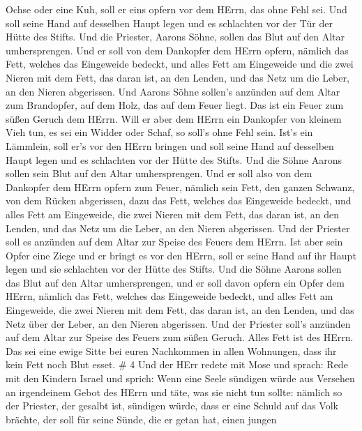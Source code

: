 Ochse oder eine Kuh, soll er eins opfern vor dem HErrn, das ohne Fehl
sei.  Und soll seine Hand auf desselben Haupt legen und es
schlachten vor der Tür der Hütte des Stifts. Und die Priester, Aarons
Söhne, sollen das Blut auf den Altar umhersprengen.  Und er
soll von dem Dankopfer dem HErrn opfern, nämlich das Fett, welches das
Eingeweide bedeckt, und alles Fett am Eingeweide  und die
zwei Nieren mit dem Fett, das daran ist, an den Lenden, und das Netz um
die Leber, an den Nieren abgerissen.  Und Aarons Söhne
sollen's anzünden auf dem Altar zum Brandopfer, auf dem Holz, das auf
dem Feuer liegt. Das ist ein Feuer zum süßen Geruch dem HErrn.
 Will er aber dem HErrn ein Dankopfer von kleinem Vieh tun,
es sei ein Widder oder Schaf, so soll's ohne Fehl sein. 
Ist's ein Lämmlein, soll er's vor den HErrn bringen  und
soll seine Hand auf desselben Haupt legen und es schlachten vor der
Hütte des Stifts. Und die Söhne Aarons sollen sein Blut auf den Altar
umhersprengen.  Und er soll also von dem Dankopfer dem HErrn
opfern zum Feuer, nämlich sein Fett, den ganzen Schwanz, von dem Rücken
abgerissen, dazu das Fett, welches das Eingeweide bedeckt, und alles
Fett am Eingeweide,  die zwei Nieren mit dem Fett, das
daran ist, an den Lenden, und das Netz um die Leber, an den Nieren
abgerissen.  Und der Priester soll es anzünden auf dem
Altar zur Speise des Feuers dem HErrn.  Ist aber sein Opfer
eine Ziege und er bringt es vor den HErrn,  soll er seine
Hand auf ihr Haupt legen und sie schlachten vor der Hütte des Stifts.
Und die Söhne Aarons sollen das Blut auf den Altar umhersprengen,
 und er soll davon opfern ein Opfer dem HErrn, nämlich das
Fett, welches das Eingeweide bedeckt, und alles Fett am Eingeweide,
 die zwei Nieren mit dem Fett, das daran ist, an den
Lenden, und das Netz über der Leber, an den Nieren abgerissen.
 Und der Priester soll's anzünden auf dem Altar zur Speise
des Feuers zum süßen Geruch. Alles Fett ist des HErrn.  Das
sei eine ewige Sitte bei euren Nachkommen in allen Wohnungen, dass ihr
kein Fett noch Blut esset. \# 4  Und der HErr redete mit
Mose und sprach:  Rede mit den Kindern Israel und sprich:
Wenn eine Seele sündigen würde aus Versehen an irgendeinem Gebot des
HErrn und täte, was sie nicht tun sollte:  nämlich so der
Priester, der gesalbt ist, sündigen würde, dass er eine Schuld auf das
Volk brächte, der soll für seine Sünde, die er getan hat, einen jungen

